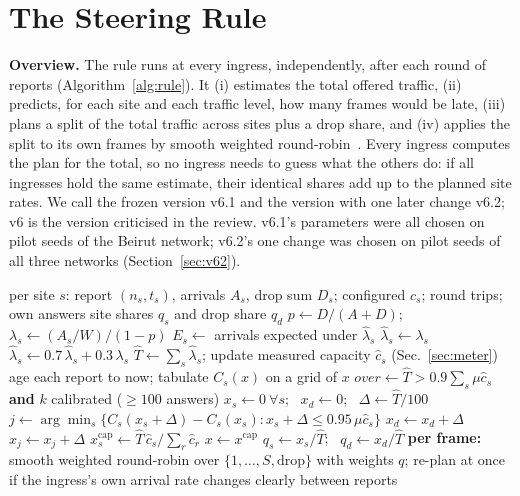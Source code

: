 \documentclass[conference]{IEEEtran}
\newcommand{\That}{\hat{T}}
\begin{document}
\section{The Steering Rule}\label{sec:rule}
\textbf{Overview.} The rule runs at every ingress, independently, after each round of reports (Algorithm~\ref{alg:rule}). It (i) estimates the total offered traffic, (ii) predicts, for each site and each traffic level, how many frames would be late, (iii) plans a split of the total traffic across sites plus a drop share, and (iv) applies the split to its own frames by smooth weighted round-robin~\cite{swrr}. Every ingress computes the plan for the total, so no ingress needs to guess what the others do: if all ingresses hold the same estimate, their identical shares add up to the planned site rates. We call the frozen version v6.1 and the version with one later change v6.2; v6 is the version criticised in the review. v6.1's parameters were all chosen on pilot seeds of the Beirut network; v6.2's one change was chosen on pilot seeds of all three networks (Section~\ref{sec:v62}).

\begin{algorithm}[t]
\caption{Ingress $i$, after each round of reports (v6.2)}\label{alg:rule}
\small
\begin{algorithmic}[1]
\Require per site $s$: report $(n_s, t_s)$, arrivals $A_s$, drop sum $D_s$; configured $c_s$; round trips; own answers
\Ensure site shares $q_s$ and drop share $q_d$
\State $p \gets D/(A+D)$; \ $\lambda_s \gets (A_s/W)/(1-p)$ 
  \State $E_s \gets$ arrivals expected under $\hat\lambda_s$
   $\hat\lambda_s \gets \lambda_s$ 
  \Else\ $\hat\lambda_s \gets 0.7\,\hat\lambda_s + 0.3\,\lambda_s$
  \EndIf
\EndFor
\State $\That \gets \sum_s \hat\lambda_s$; update measured capacity $\hat c_s$ (Sec.~\ref{sec:meter})
\State age each report to now; tabulate $C_s(x)$ on a grid of $x$ 
\State $\mathit{over} \gets \That > 0.9\sum_s \mu\hat c_s$ \textbf{and} $k$ calibrated ($\ge 100$ answers)
\State $x_s \gets 0\ \forall s$; \ $x_d \gets 0$; \ $\Delta \gets \That/100$
  \State $j \gets \arg\min_s \{C_s(x_s+\Delta) - C_s(x_s) : x_s+\Delta \le 0.95\,\mu\hat c_s\}$
    \State $x_d \gets x_d + \Delta$ 
  \Else\ $x_j \gets x_j + \Delta$
  \EndIf
\EndFor
{}
  \State $x^{\mathrm{cap}}_s \gets \That\,\hat c_s/\sum_r \hat c_r$ 
   $x \gets x^{\mathrm{cap}}$ \EndIf
\EndIf
\State $q_s \gets x_s/\That$; \ $q_d \gets x_d/\That$
\State \textbf{per frame:} smooth weighted round-robin over $\{1,\dots,S,\text{drop}\}$ with weights $q$; re-plan at once if the ingress's own arrival rate changes clearly between reports
\end{algorithmic}
\end{algorithm}
\end{document}
